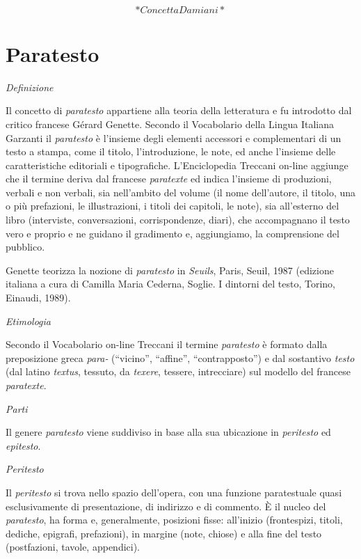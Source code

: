 \documentclass[
  b5paper,
  twoside,
  11pt,
  chapterprefix=false,
  bibliography=totocnumbered,
  listof=flat]{scrbook}
\begin{document}
~

\[*Concetta Damiani*\]

\hypertarget{paratesto}{%
\chapter{Paratesto}\label{paratesto}}

\emph{Definizione}

Il concetto di \emph{paratesto} appartiene alla teoria della letteratura e fu
introdotto dal critico francese Gérard Genette. Secondo il Vocabolario
della Lingua Italiana Garzanti il \emph{paratesto} è l'insieme degli elementi
accessori e complementari di un testo a stampa, come il titolo,
l'introduzione, le note, ed anche l'insieme delle caratteristiche
editoriali e tipografiche. L'Enciclopedia Treccani on-line aggiunge che
il termine deriva dal francese \emph{paratexte} ed indica l'insieme di
produzioni, verbali e non verbali, sia nell'ambito del volume (il nome
dell'autore, il titolo, una o più prefazioni, le illustrazioni, i titoli
dei capitoli, le note), sia all'esterno del libro (interviste,
conversazioni, corrispondenze, diari), che accompagnano il testo vero e
proprio e ne guidano il gradimento e, aggiungiamo, la comprensione del
pubblico.

Genette teorizza la nozione di \emph{paratesto} in \emph{Seuils}, Paris, Seuil,
1987 (edizione italiana a cura di Camilla Maria Cederna, Soglie. I
dintorni del testo, Torino, Einaudi, 1989).

\emph{Etimologia}

Secondo il Vocabolario on-line Treccani il termine \emph{paratesto} è formato
dalla preposizione greca \emph{para-} (\enquote{vicino}, \enquote{affine}, \enquote{contrapposto}) e
dal sostantivo \emph{testo} (dal latino \emph{textus}, tessuto, da \emph{texere},
tessere, intrecciare) sul modello del francese \emph{paratexte}.

\emph{Parti}

Il genere \emph{paratesto} viene suddiviso in base alla sua ubicazione in
\emph{peritesto} ed \emph{epitesto}.

\emph{Peritesto}

Il \emph{peritesto} si trova nello spazio dell'opera, con una funzione
paratestuale quasi esclusivamente di presentazione, di indirizzo e di
commento. È il nucleo del \emph{paratesto}, ha forma e, generalmente,
posizioni fisse: all'inizio (frontespizi, titoli, dediche, epigrafi,
prefazioni), in margine (note, chiose) e alla fine del testo
(postfazioni, tavole, appendici).
\end{document}

